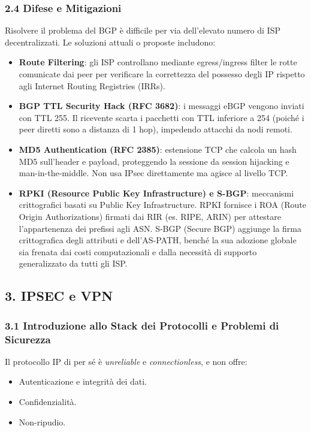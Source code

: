 \documentclass{article}
\begin{document}
\subsubsection{2.4 Difese e Mitigazioni}
Risolvere il problema del BGP è difficile per via dell'elevato numero di ISP decentralizzati. Le soluzioni attuali o proposte includono:
\begin{itemize}
    \item \textbf{Route Filtering}: gli ISP controllano mediante egress/ingress filter le rotte comunicate dai peer per verificare la correttezza del possesso degli IP rispetto agli Internet Routing Registries (IRRs).
    \item \textbf{BGP TTL Security Hack (RFC 3682)}: i messaggi eBGP vengono inviati con TTL 255. Il ricevente scarta i pacchetti con TTL inferiore a 254 (poiché i peer diretti sono a distanza di 1 hop), impedendo attacchi da nodi remoti.
    \item \textbf{MD5 Authentication (RFC 2385)}: estensione TCP che calcola un hash MD5 sull'header e payload, proteggendo la sessione da session hijacking e man-in-the-middle. Non usa IPsec direttamente ma agisce al livello TCP.
    \item \textbf{RPKI (Resource Public Key Infrastructure) e S-BGP}: meccanismi crittografici basati su Public Key Infrastructure. RPKI fornisce i ROA (Route Origin Authorizations) firmati dai RIR (es. RIPE, ARIN) per attestare l'appartenenza dei prefissi agli ASN. S-BGP (Secure BGP) aggiunge la firma crittografica degli attributi e dell'AS-PATH, benché la sua adozione globale sia frenata dai costi computazionali e dalla necessità di supporto generalizzato da tutti gli ISP.
\end{itemize}

\subsection{3. IPSEC e VPN}

\subsubsection{3.1 Introduzione allo Stack dei Protocolli e Problemi di Sicurezza}
Il protocollo IP di per sé è \emph{unreliable} e \emph{connectionless}, e non offre:
\begin{itemize}
    \item Autenticazione e integrità dei dati.
    \item Confidenzialità.
    \item Non-ripudio.
\end{itemize}
\end{document}
